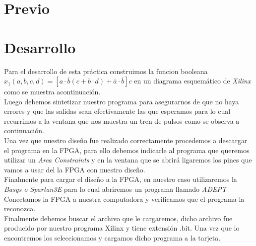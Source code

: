 \documentclass{mylib/reporteConCalif}
\newcommand{\funx}{x_1(a,b,c,d) = [a \cdot \overline{b}(c+b \cdot d) + \overline{a} \cdot \overline{b} ]c}
\begin{document}

\newpage
\section{Previo}

\newpage
\section{Desarrollo}

Para el desarrollo de esta práctica construimos la funcion booleana $\funx$ en un diagrama esquemático de \textit{Xilinx} como se muestra acontinuación.\\


Luego debemos sintetizar nuestro programa para asegurarnos de que no haya errores y que las salidas sean efectivamente las que esperamos para lo cual recurrimos a la ventana que nos muestra un tren de pulsos como se observa a continuación.\\


Una vez que nuestro diseño fue realizado correctamente procedemos a descargar el programa en la FPGA, para ello debemos indicarle al programa que queremos utilizar un \textit{Area Constraints} y en la ventana que se abrirá ligaremos los pines que vamos a usar del la FPGA con nuestro diseño.\\


Finalmente para cargar el diseño a la FPGA, en nuestro caso utilizaremos la \textit{Basys o Spartan3E} para lo cual abriremos un programa llamado \textit{ADEPT} \\


Conectamos la FPGA a nuestra computadora y verificamos que el programa la reconozca. \\

Finalmente debemos buscar el archivo que le cargaremos, dicho archivo fue producido por nuestro programa Xilinx y tiene extensión .bit. Una vez que lo encontremos los seleccionamos y cargamos dicho programa a la tarjeta.\\
\end{document}
